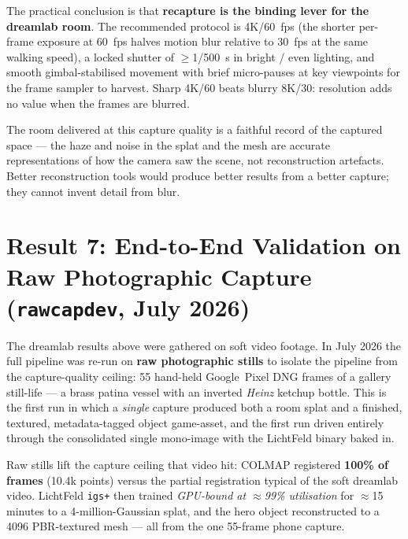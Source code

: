 The practical conclusion is that \textbf{recapture is the binding lever for the dreamlab
room}.  The recommended protocol is 4K/60~fps (the shorter per-frame exposure at 60~fps
halves motion blur relative to 30~fps at the same walking speed), a locked shutter of
$\geq$1/500~s in bright / even lighting, and smooth gimbal-stabilised movement with brief
micro-pauses at key viewpoints for the frame sampler to harvest.  Sharp 4K/60 beats
blurry 8K/30: resolution adds no value when the frames are blurred.

The room delivered at this capture quality is a faithful record of the captured space ---
the haze and noise in the splat and the mesh are accurate representations of how the
camera saw the scene, not reconstruction artefacts.  Better reconstruction tools would
produce better results from a better capture; they cannot invent detail from blur.

\section{Result 7: End-to-End Validation on Raw Photographic Capture (\texttt{rawcapdev}, July 2026)}
\label{sec:results:rawcapdev}

The dreamlab results above were gathered on soft video footage. In July 2026 the full
pipeline was re-run on \textbf{raw photographic stills} to isolate the pipeline from the
capture-quality ceiling: 55 hand-held Google~Pixel DNG frames of a gallery still-life ---
a brass patina vessel with an inverted \emph{Heinz} ketchup bottle. This is the first
run in which a \emph{single} capture produced both a room splat and a finished, textured,
metadata-tagged object game-asset, and the first run driven entirely through the
consolidated single mono-image with the LichtFeld binary baked in.

\begin{keyfinding}[title={Key Finding: one capture, both deliverables}]
Raw stills lift the capture ceiling that video hit: COLMAP registered \textbf{100\% of
frames} (10.4k points) versus the partial registration typical of the soft dreamlab
video. LichtFeld \texttt{igs+} then trained \emph{GPU-bound at $\approx$99\% utilisation}
for $\approx$15 minutes to a 4-million-Gaussian splat, and the hero object reconstructed
to a 4096 PBR-textured mesh --- all from the one 55-frame phone capture.
\end{keyfinding}

